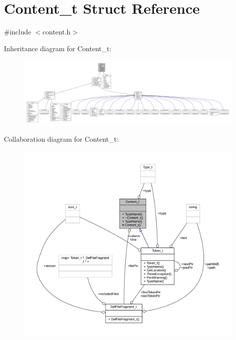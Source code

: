 \hypertarget{struct_content__t}{}\section{Content\+\_\+t Struct Reference}
\label{struct_content__t}


{\ttfamily \#include $<$content.\+h$>$}



Inheritance diagram for Content\+\_\+t\+:
\nopagebreak
\begin{figure}[H]
\begin{center}
\leavevmode
\includegraphics[width=350pt]{struct_content__t__inherit__graph}
\end{center}
\end{figure}


Collaboration diagram for Content\+\_\+t\+:
\nopagebreak
\begin{figure}[H]
\begin{center}
\leavevmode
\includegraphics[width=350pt]{struct_content__t__coll__graph}
\end{center}
\end{figure}
